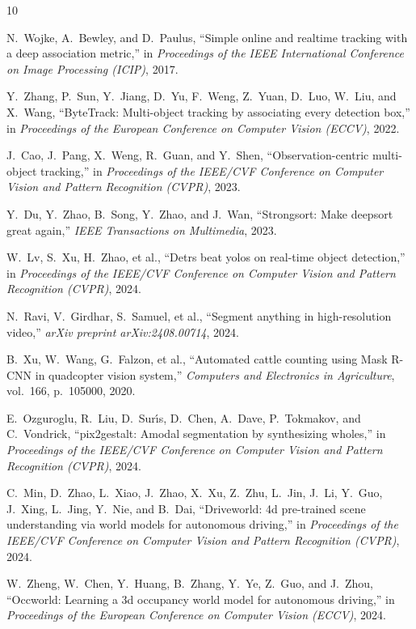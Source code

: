 \documentclass[10pt,conference,letterpaper,twocolumn]{article}
\begin{document}

\begin{thebibliography}{10}

N.~Wojke, A.~Bewley, and D.~Paulus, ``Simple online and realtime tracking with a deep association metric,'' in {\em Proceedings of the IEEE International Conference on Image Processing (ICIP)}, 2017.

Y.~Zhang, P.~Sun, Y.~Jiang, D.~Yu, F.~Weng, Z.~Yuan, D.~Luo, W.~Liu, and X.~Wang, ``ByteTrack: Multi-object tracking by associating every detection box,'' in {\em Proceedings of the European Conference on Computer Vision (ECCV)}, 2022.

J.~Cao, J.~Pang, X.~Weng, R.~Guan, and Y.~Shen, ``Observation-centric multi-object tracking,'' in {\em Proceedings of the IEEE/CVF Conference on Computer Vision and Pattern Recognition (CVPR)}, 2023.

Y.~Du, Y.~Zhao, B.~Song, Y.~Zhao, and J.~Wan, ``Strongsort: Make deepsort great again,'' {\em IEEE Transactions on Multimedia}, 2023.

W.~Lv, S.~Xu, H.~Zhao, et al., ``Detrs beat yolos on real-time object detection,'' in {\em Proceedings of the IEEE/CVF Conference on Computer Vision and Pattern Recognition (CVPR)}, 2024.

N.~Ravi, V.~Girdhar, S.~Samuel, et al., ``Segment anything in high-resolution video,'' {\em arXiv preprint arXiv:2408.00714}, 2024.

B.~Xu, W.~Wang, G.~Falzon, et al., ``Automated cattle counting using Mask R-CNN in quadcopter vision system,'' {\em Computers and Electronics in Agriculture}, vol.~166, p.~105000, 2020.

E.~Ozguroglu, R.~Liu, D.~Sur{\'\i}s, D.~Chen, A.~Dave, P.~Tokmakov, and C.~Vondrick, ``pix2gestalt: Amodal segmentation by synthesizing wholes,'' in {\em Proceedings of the IEEE/CVF Conference on Computer Vision and Pattern Recognition (CVPR)}, 2024.

C.~Min, D.~Zhao, L.~Xiao, J.~Zhao, X.~Xu, Z.~Zhu, L.~Jin, J.~Li, Y.~Guo, J.~Xing, L.~Jing, Y.~Nie, and B.~Dai, ``Driveworld: 4d pre-trained scene understanding via world models for autonomous driving,'' in {\em Proceedings of the IEEE/CVF Conference on Computer Vision and Pattern Recognition (CVPR)}, 2024.

W.~Zheng, W.~Chen, Y.~Huang, B.~Zhang, Y.~Ye, Z.~Guo, and J.~Zhou, ``Occworld: Learning a 3d occupancy world model for autonomous driving,'' in {\em Proceedings of the European Conference on Computer Vision (ECCV)}, 2024.


\end{thebibliography}
\end{document}
